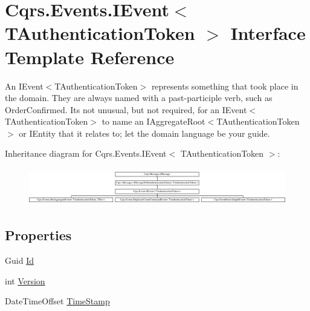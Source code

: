 \hypertarget{interfaceCqrs_1_1Events_1_1IEvent}{}\section{Cqrs.\+Events.\+I\+Event$<$ T\+Authentication\+Token $>$ Interface Template Reference}
\label{interfaceCqrs_1_1Events_1_1IEvent}


An I\+Event$<$\+T\+Authentication\+Token$>$ represents something that took place in the domain. They are always named with a past-\/participle verb, such as Order\+Confirmed. It\textquotesingle{}s not unusual, but not required, for an I\+Event$<$\+T\+Authentication\+Token$>$ to name an I\+Aggregate\+Root$<$\+T\+Authentication\+Token$>$ or I\+Entity that it relates to; let the domain language be your guide.  


Inheritance diagram for Cqrs.\+Events.\+I\+Event$<$ T\+Authentication\+Token $>$\+:\begin{figure}[H]
\begin{center}
\leavevmode
\includegraphics[height=1.651917cm]{interfaceCqrs_1_1Events_1_1IEvent}
\end{center}
\end{figure}
\subsection*{Properties}
\begin{DoxyCompactItemize}
\item 
Guid \hyperlink{interfaceCqrs_1_1Events_1_1IEvent_a2974e13d307c62c5cc438d668ff1783b_a2974e13d307c62c5cc438d668ff1783b}{Id}
\item 
int \hyperlink{interfaceCqrs_1_1Events_1_1IEvent_a2754e056f483b9a8e59622a363276b15_a2754e056f483b9a8e59622a363276b15}{Version}
\item 
Date\+Time\+Offset \hyperlink{interfaceCqrs_1_1Events_1_1IEvent_a149d6ea1652cbcc63dbc45eaa71fade0_a149d6ea1652cbcc63dbc45eaa71fade0}{Time\+Stamp}
\end{DoxyCompactItemize}



